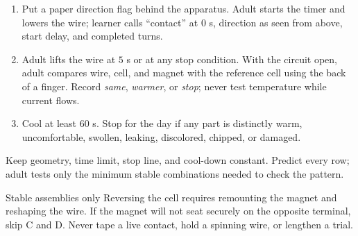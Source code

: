 \begin{enumerate}[resume]
\item Put a paper direction flag behind the apparatus. Adult starts the timer
and lowers the wire; learner calls ``contact'' at \(0\) s, direction as seen
from above, start delay, and completed turns.
\item Adult lifts the wire at \(5\) s or at any stop condition. With the circuit
open, adult compares wire, cell, and magnet with the reference cell using the
back of a finger. Record \emph{same}, \emph{warmer}, or \emph{stop}; never test
temperature while current flows.
\item Cool at least \(60\) s. Stop for the day if any part is distinctly warm,
uncomfortable, swollen, leaking, discolored, chipped, or damaged.
\end{enumerate}

\begin{center}
\end{center}

Keep geometry, time limit, stop line, and cool-down constant. Predict every row;
adult tests only the minimum stable combinations needed to check the pattern.

\begin{gate}{Stable assemblies only}
Reversing the cell requires remounting the magnet and reshaping the wire. If
the magnet will not seat securely on the opposite terminal, skip C and D.
Never tape a live contact, hold a spinning wire, or lengthen a trial.
\end{gate}

